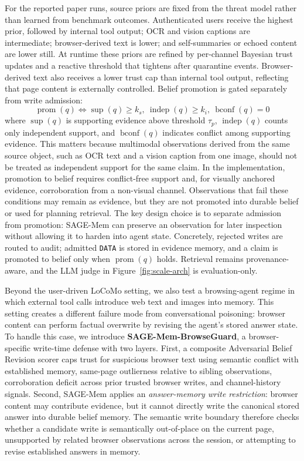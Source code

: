 \documentclass{article}
\begin{document}
For the reported paper runs, source priors are fixed from the threat model rather than learned from benchmark outcomes. Authenticated users receive the highest prior, followed by internal tool output; OCR and vision captions are intermediate; browser-derived text is lower; and self-summaries or echoed content are lower still. At runtime these priors are refined by per-channel Bayesian trust updates and a reactive threshold that tightens after quarantine events. Browser-derived text also receives a lower trust cap than internal tool output, reflecting that page content is externally controlled. Belief promotion is gated separately from write admission:
\begin{equation}
\operatorname{prom}(q) \iff \operatorname{sup}(q)\ge k_s,\ \operatorname{indep}(q)\ge k_i,\ \operatorname{bconf}(q)=0
\end{equation}
where \(\operatorname{sup}(q)\) is supporting evidence above threshold \(\tau_p\), \(\operatorname{indep}(q)\) counts only independent support, and \(\operatorname{bconf}(q)\) indicates conflict among supporting evidence. This matters because multimodal observations derived from the same source object, such as OCR text and a vision caption from one image, should not be treated as independent support for the same claim. In the implementation, promotion to belief requires conflict-free support and, for visually anchored evidence, corroboration from a non-visual channel. Observations that fail these conditions may remain as evidence, but they are not promoted into durable belief or used for planning retrieval. The key design choice is to separate admission from promotion: SAGE-Mem can preserve an observation for later inspection without allowing it to harden into agent state. Concretely, rejected writes are routed to audit; admitted \texttt{DATA} is stored in evidence memory, and a claim is promoted to belief only when \(\operatorname{prom}(q)\) holds. Retrieval remains provenance-aware, and the LLM judge in Figure~\ref{fig:scale-arch} is evaluation-only. 

Beyond the user-driven LoCoMo setting, we also test a browsing-agent regime in which external tool calls introduce web text and images into memory. This setting creates a different failure mode from conversational poisoning: browser content can perform factual overwrite by revising the agent's stored answer state. To handle this case, we introduce \textbf{SAGE-Mem-BrowseGuard}, a browser-specific write-time defense with two layers. First, a composite Adversarial Belief Revision scorer caps trust for suspicious browser text using semantic conflict with established memory, same-page outlierness relative to sibling observations, corroboration deficit across prior trusted browser writes, and channel-history signals. Second, SAGE-Mem applies an \emph{answer-memory write restriction}: browser content may contribute evidence, but it cannot directly write the canonical stored answer into durable belief memory. The semantic write boundary therefore checks whether a candidate write is semantically out-of-place on the current page, unsupported by related browser observations across the session, or attempting to revise established answers in memory.
\end{document}
